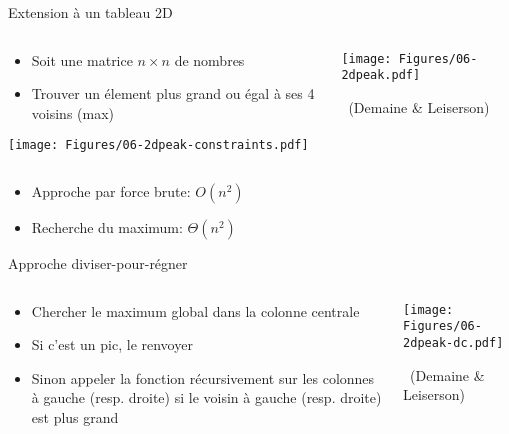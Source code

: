 \begin{frame}{Extension à un tableau 2D}

\begin{columns}
\begin{column}{5cm}
\begin{itemize}
\item Soit une matrice $n\times n$ de nombres
\item Trouver un élement plus grand ou égal à ses 4 voisins (max)
\end{itemize}

\bigskip

\centerline{\texttt{[image: Figures/06-2dpeak-constraints.pdf]}}
\end{column}
\begin{column}{5cm}
\centerline{\texttt{[image: Figures/06-2dpeak.pdf]}}
~\hfill{\scriptsize(Demaine \& Leiserson)}
\end{column}
\end{columns}

\bigskip

\begin{itemize}
\item Approche par force brute: $O(n^2)$
\item Recherche du maximum: $\Theta(n^2)$
\end{itemize}

\end{frame}

\begin{frame}{Approche diviser-pour-régner}

\begin{columns}
\begin{column}{7cm}
\begin{itemize}
\item Chercher le maximum global dans la colonne \alert{centrale}
\item Si c'est un pic, le renvoyer
\item Sinon appeler la fonction récursivement sur les colonnes à
  gauche (resp. droite) si le voisin à gauche (resp. droite) est plus grand
\end{itemize}

\end{column}
\begin{column}{4cm}
\centerline{\texttt{[image: Figures/06-2dpeak-dc.pdf]}}
~\hfill{\scriptsize(Demaine \& Leiserson)}
\end{column}
\end{columns}

\bigskip

\end{frame}

